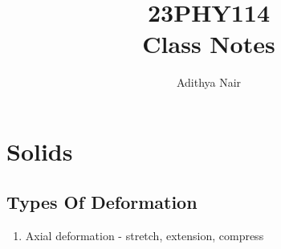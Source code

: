 \documentclass{report}
\title{\Huge{23PHY114}\\ Class Notes}
\author{\huge{Adithya Nair}}
\date{}
\begin{document}
\maketitle
\newpage%
\tableofcontents
\chapter{Solids}
\section{Types Of Deformation}
\begin{enumerate}
	\item Axial deformation - stretch, extension, compress
\end{enumerate}
\pagebreak
\end{document}
